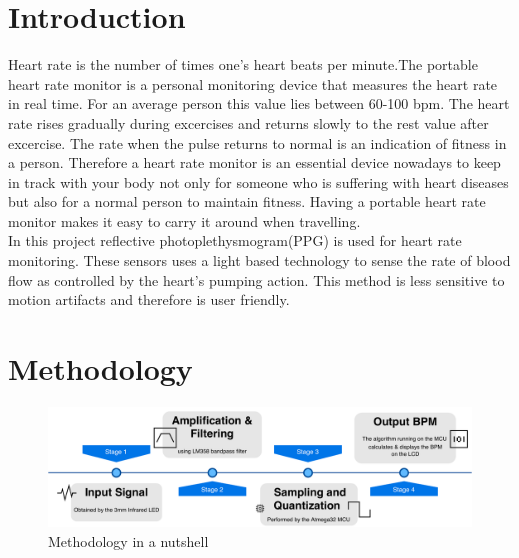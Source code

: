 \documentclass[12pt]{article}
\begin{document}
{%
\section{Introduction}
Heart rate is the number of times one’s heart beats per minute.The portable heart rate monitor is a personal monitoring device that measures the heart rate in real time. For an average person this value lies between 60-100 bpm. The heart rate rises gradually during excercises and returns slowly to the rest value after excercise. The rate when the pulse returns to normal is an indication of fitness in a person.  Therefore a heart rate monitor is an essential device nowadays to keep in track with your body not only for someone who is suffering with heart diseases but also for a normal person to maintain fitness. Having a portable heart rate monitor makes it easy to carry it around when travelling. 
\\
In this project reflective photoplethysmogram(PPG) is used for heart rate monitoring. These sensors uses a light based technology to sense the rate of blood flow as controlled by the heart’s pumping action. This method is less sensitive to motion artifacts and therefore is user friendly.
\\









\newpage
\section{Methodology}

	\begin{figure}[!htbp]  %
		\centering
		\includegraphics[width=1\textwidth]{block_summary}
		\caption{Methodology in a nutshell}
	\end{figure}

}
\end{document}
